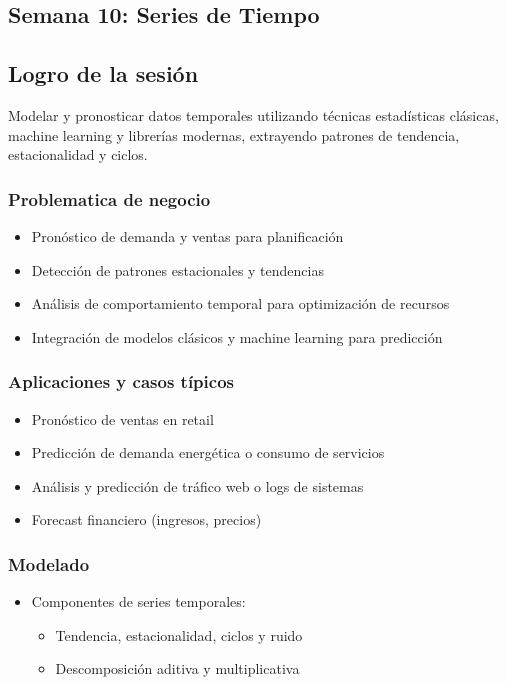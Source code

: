 \documentclass[12pt,a4paper,openany,oneside]{book}
\begin{document}
\begin{itemize}
\chapter{Semana 10: Series de Tiempo}

\section{Logro de la sesión}
Modelar y pronosticar datos temporales utilizando técnicas estadísticas clásicas, machine learning y librerías modernas, extrayendo patrones de tendencia, estacionalidad y ciclos.

\subsection{Problematica de negocio}
\begin{itemize}
    \item Pronóstico de demanda y ventas para planificación
    \item Detección de patrones estacionales y tendencias
    \item Análisis de comportamiento temporal para optimización de recursos
    \item Integración de modelos clásicos y machine learning para predicción
\end{itemize}

\subsection{Aplicaciones y casos típicos}
\begin{itemize}
    \item Pronóstico de ventas en retail
    \item Predicción de demanda energética o consumo de servicios
    \item Análisis y predicción de tráfico web o logs de sistemas
    \item Forecast financiero (ingresos, precios)
\end{itemize}

\subsection{Modelado}
\begin{itemize}
    \item Componentes de series temporales:
    \begin{itemize}
        \item Tendencia, estacionalidad, ciclos y ruido
        \item Descomposición aditiva y multiplicativa
    \end{itemize}
    

\end{itemize}
\end{itemize}
\end{document}
